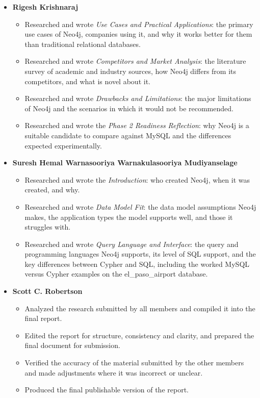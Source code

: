 \documentclass[11pt,a4paper]{article}
\begin{document}
\begin{itemize}
  \item \textbf{Rigesh Krishnaraj}
    \begin{itemize}
      \item Researched and wrote \textit{Use Cases and Practical Applications}: the primary use cases of Neo4j, companies using it, and why it works better for them than traditional relational databases.
      \item Researched and wrote \textit{Competitors and Market Analysis}: the literature survey of academic and industry sources, how Neo4j differs from its competitors, and what is novel about it.
      \item Researched and wrote \textit{Drawbacks and Limitations}: the major limitations of Neo4j and the scenarios in which it would not be recommended.
      \item Researched and wrote the \textit{Phase 2 Readiness Reflection}: why Neo4j is a suitable candidate to compare against MySQL and the differences expected experimentally.
    \end{itemize}
  \item \textbf{Suresh Hemal Warnasooriya Warnakulasooriya Mudiyanselage}
    \begin{itemize}
      \item Researched and wrote the \textit{Introduction}: who created Neo4j, when it was created, and why.
      \item Researched and wrote \textit{Data Model Fit}: the data model assumptions Neo4j makes, the application types the model supports well, and those it struggles with.
      \item Researched and wrote \textit{Query Language and Interface}: the query and programming languages Neo4j supports, its level of SQL support, and the key differences between Cypher and SQL, including the worked MySQL versus Cypher examples on the el\_paso\_airport database.
    \end{itemize}
  \item \textbf{Scott C. Robertson}
    \begin{itemize}
      \item Analyzed the research submitted by all members and compiled it into the final report.
      \item Edited the report for structure, consistency and clarity, and prepared the final document for submission.
      \item Verified the accuracy of the material submitted by the other members and made adjustments where it was incorrect or unclear.
      \item Produced the final publishable version of the report.
    \end{itemize}
\end{itemize}

\clearpage
{}


\end{document}
